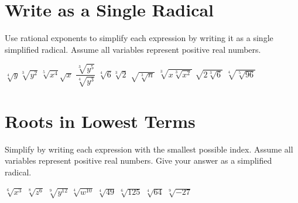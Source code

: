\section*{Write as a Single Radical}
Use rational exponents to simplify each expression by writing it as a single simplified radical.  Assume all variables represent positive real numbers.
\begin{smenum}
\mitemxxxx
{$\sqrt[4]{y}\sqrt[3]{y^2}$}
{$\sqrt[5]{x^4}\sqrt{x}$}
{$\dfrac{\sqrt[3]{y^5}}{\sqrt[4]{y^3}}$}
{$\sqrt[4]{6}\sqrt[3]{2}$}
\mitemxxxx
{$\sqrt{\sqrt[3]{n}}$}
{$\sqrt[3]{x\sqrt[3]{x^2}}$}
{$\sqrt{2\sqrt[3]{6}}$}
{$\sqrt[4]{\sqrt[5]{96}}$}
\end{smenum}

\section*{Roots in Lowest Terms}
Simplify by writing each expression with the smallest possible index. Assume all variables represent positive real numbers. Give your answer as a simplified radical.
\begin{smenum}
\mitemxxxx
{$\sqrt[6]{x^3}$}
{$\sqrt[8]{z^6}$}
{$\sqrt[9]{y^{12}}$}
{$\sqrt[4]{w^{10}}$}
\mitemxxxx
{$\sqrt[4]{49}$}
{$\sqrt[6]{125}$}
{$\sqrt[4]{64}$}
{$\sqrt[9]{-27}$}
\end{smenum}

